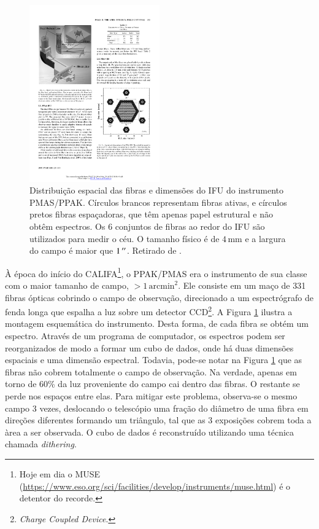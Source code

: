 \begin{figure}
	\includegraphics[width=0.5\textwidth]{figuras/PPAK}
	\caption[Distribuição das fibras no instrumento PMAS/PPAK]
	{Distribuição espacial das fibras e dimensões do IFU do instrumento PMAS/PPAK.
	Círculos brancos representam fibras ativas, e círculos pretos fibras
	espaçadoras, que têm apenas papel estrutural e não obtêm espectros. Os 6
	conjuntos de fibras ao redor do IFU são utilizados para medir o céu. O tamanho
	físico é de $4\,\mathrm{mm}$ e a largura do campo é maior que $1\,^{\prime\prime}$.
	Retirado de	\citet{Kelz2006}.}
	\label{fig:PPAK}
\end{figure}

À época do início do CALIFA\footnote{Hoje em dia o MUSE
(\url{https://www.eso.org/sci/facilities/develop/instruments/muse.html}) é o
detentor do recorde.}, o PPAK/PMAS era o instrumento de sua classe com o maior
tamanho de campo, $>1\,\mathrm{arcmin}^2$. Ele consiste em um maço de 331 fibras
ópticas cobrindo o campo de observação, direcionado a um espectrógrafo de fenda
longa que espalha a luz sobre um detector CCD\footnote{{\em Charge Coupled
Device}.}.
A Figura \ref{fig:PPAK} ilustra a montagem esquemática do instrumento. Desta
forma, de cada fibra se obtém um espectro. Através de um programa de computador,
os espectros podem ser reorganizados de modo a formar um cubo de dados, onde há
duas dimensões espaciais e uma dimensão espectral.
Todavia, pode-se notar na Figura \ref{fig:PPAK} que as fibras não cobrem
totalmente o campo de observação. Na verdade, apenas em torno de 60\% da luz
proveniente do campo cai dentro das fibras. O restante se perde nos espaços
entre elas. Para mitigar este problema, observa-se o mesmo campo 3 vezes,
deslocando o telescópio uma fração do diâmetro de uma fibra em direções
diferentes formando um triângulo, tal que as 3 exposições cobrem toda a àrea a
ser observada. O cubo de dados é reconstruído utilizando uma técnica chamada
{\em dithering}.

